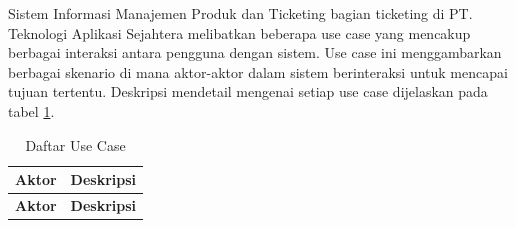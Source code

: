 \documentclass[12pt]{article}
\begin{document}
\begin{enumerate}[label=\textbf{4.\arabic*.}]
\begin{enumerate}[label=\textbf{4.1.\arabic*.}]
        Sistem Informasi Manajemen Produk dan Ticketing bagian ticketing di PT. Teknologi Aplikasi Sejahtera melibatkan beberapa use case yang mencakup berbagai interaksi antara pengguna dengan sistem. Use case ini menggambarkan berbagai skenario di mana aktor-aktor dalam sistem berinteraksi untuk mencapai tujuan tertentu. Deskripsi mendetail mengenai setiap use case dijelaskan pada tabel \ref{table:use-case}.

        \begin{longtable}{|l|p{}|}
            \caption{Daftar Use Case} \label{table:use-case} \\
            \hline
            \textbf{Aktor} & \textbf{Deskripsi} \\
            \hline
            \endfirsthead
          
            \hline
            \textbf{Aktor} & \textbf{Deskripsi} \\
            \hline
            \endhead
          

\end{longtable}
\end{enumerate}
\end{enumerate}
\end{document}

